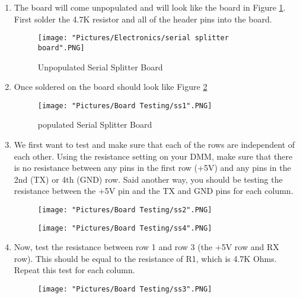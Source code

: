 \documentclass[12pt]{article}
\begin{document}
\begin{enumerate}
	\item The board will come unpopulated and will look like the board in Figure \ref{ss}. First solder the 4.7K resistor and all of the header pins into 		the board. 

	\begin{figure}[H]
	  	\centering
	    	\texttt{[image: "Pictures/Electronics/serial splitter board".PNG]}
		\caption{Unpopulated Serial Splitter Board}
		\label{ss}
	\end{figure}

	\item Once soldered on the board should look like Figure \ref{ss1}

	\begin{figure}[H]
	  	\centering
	    	\texttt{[image: "Pictures/Board Testing/ss1".PNG]}
		\caption{populated Serial Splitter Board}
		\label{ss1}
	\end{figure}

	\item We first want to test and make sure that each of the rows are independent of each other. Using the resistance setting on your DMM, make sure that there is no resistance between any pins in the first row (+5V) and any pins in the 2nd (TX) or 4th (GND) row.  Said another way, you should be testing the resistance between the +5V pin and the TX and GND pins for each column. 

	\begin{figure}[H]
	 	\centering
	  	\begin{minipage}[b]{0.45\textwidth}
			\texttt{[image: "Pictures/Board Testing/ss2".PNG]}
	  	\end{minipage}
	  	\hfill
	  	\begin{minipage}[b]{0.45\textwidth}
	    		\texttt{[image: "Pictures/Board Testing/ss4".PNG]}
	  	\end{minipage}
		\label{sstest1}
	\end{figure}

	\item Now, test the resistance between row 1 and row 3 (the +5V row and RX row). This should be equal to the resistance of R1, which is 4.7K Ohms. Repeat this test for each column.

	\begin{figure}[H]
	  	\centering
	    	\texttt{[image: "Pictures/Board Testing/ss3".PNG]}
		\label{ss3}
	\end{figure}
	

\end{enumerate}
\end{document}
